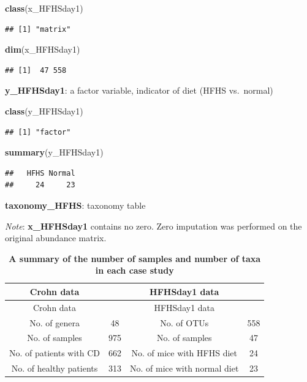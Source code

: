 \documentclass[openany]{book}
\newenvironment{Shaded}{\begin{snugshade}}{\end{snugshade}}
\newcommand{\KeywordTok}[1]{\textcolor[rgb]{0.13,0.29,0.53}{\textbf{#1}}}
\newcommand{\NormalTok}[1]{#1}
\begin{document}
\begin{Shaded}
\begin{Highlighting}[]
\KeywordTok{class}\NormalTok{(x_HFHSday1)}
\end{Highlighting}
\end{Shaded}

\begin{verbatim}
## [1] "matrix"
\end{verbatim}

\begin{Shaded}
\begin{Highlighting}[]
\KeywordTok{dim}\NormalTok{(x_HFHSday1)}
\end{Highlighting}
\end{Shaded}

\begin{verbatim}
## [1]  47 558
\end{verbatim}

\textbf{y\_HFHSday1}: a factor variable, indicator of diet (HFHS
vs.~normal)

\begin{Shaded}
\begin{Highlighting}[]
\KeywordTok{class}\NormalTok{(y_HFHSday1)}
\end{Highlighting}
\end{Shaded}

\begin{verbatim}
## [1] "factor"
\end{verbatim}

\begin{Shaded}
\begin{Highlighting}[]
\KeywordTok{summary}\NormalTok{(y_HFHSday1)}
\end{Highlighting}
\end{Shaded}

\begin{verbatim}
##   HFHS Normal 
##     24     23
\end{verbatim}

\textbf{taxonomy\_HFHS}: taxonomy table

\emph{Note}: \textbf{x\_HFHSday1} contains no zero. Zero imputation was
performed on the original abundance matrix.

\begin{longtable}[]{@{}cccc@{}}
\caption{\label{tab:summary} \textbf{A summary of the number of samples and
number of taxa in each case study}}\tabularnewline
\toprule
Crohn data & & HFHSday1 data &\tabularnewline
\midrule
\endfirsthead
\toprule
Crohn data & & HFHSday1 data &\tabularnewline
\midrule
\endhead
No. of genera & 48 & No. of OTUs & 558\tabularnewline
No. of samples & 975 & No. of samples & 47\tabularnewline
No. of patients with CD & 662 & No. of mice with HFHS diet &
24\tabularnewline
No. of healthy patients & 313 & No. of mice with normal diet &
23\tabularnewline
\bottomrule
\end{longtable}
\end{document}
